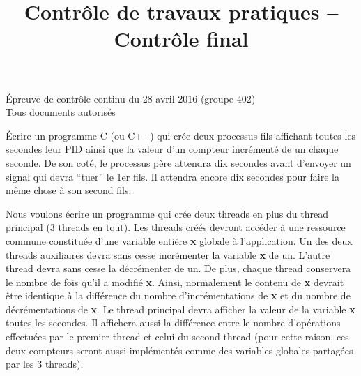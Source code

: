 \documentclass[CC,sansRappel,12pt]{tdtp-utf8}
\date{}
\title{Contrôle de travaux pratiques -- Contrôle final}
\begin{document}
\begin{feuille}

\hspace*{1mm} \hfill Épreuve de contrôle continu du 28 avril 2016 (groupe 402)\\
\hspace*{1mm} \hfill Tous documents autorisés\\[5mm]


\begin{exercice}

Écrire un programme C (ou C++) qui crée deux processus fils affichant
toutes les secondes leur PID ainsi que la valeur d'un compteur incrémenté
de un chaque seconde.
De son coté, le processus père attendra dix secondes avant d'envoyer
un signal qui devra ``tuer'' le 1er fils. Il attendra encore dix secondes
pour faire la même chose à son second fils.
\end{exercice}

\begin{exercice}

Nous voulons écrire un programme qui crée deux threads
en plus du thread principal (3 threads en tout).
Les threads créés devront accéder à une ressource commune
constituée d'une variable entière \textbf{x} globale à l'application.
Un des deux threads auxiliaires devra sans cesse incrémenter la
variable \textbf{x} de un. L'autre thread devra sans cesse la décrémenter
de un.
De plus, chaque thread conservera le nombre de fois qu'il a modifié
\textbf{x}. Ainsi, normalement le contenu de \textbf{x}
devrait être identique à la différence du nombre
d'incrémentations de
\textbf{x} et du nombre de décrémentations de \textbf{x}.
Le thread principal devra afficher la valeur de la variable \textbf{x}
toutes les secondes. Il affichera aussi la différence entre le nombre
d'opérations effectuées par le premier thread et celui du second thread
(pour cette raison, ces deux compteurs seront aussi implémentés comme
des variables globales partagées par les 3 threads).


\end{exercice}
\end{feuille}
\end{document}
